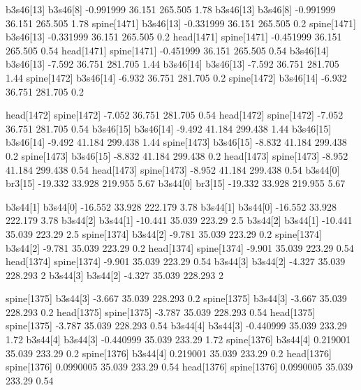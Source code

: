 b3s46[13]    b3s46[8]    -0.991999    36.151    265.505    1.78
b3s46[13]    b3s46[8]    -0.991999    36.151    265.505    1.78
spine[1471]    b3s46[13]    -0.331999    36.151    265.505    0.2
spine[1471]    b3s46[13]    -0.331999    36.151    265.505    0.2
head[1471]    spine[1471]    -0.451999    36.151    265.505    0.54
head[1471]    spine[1471]    -0.451999    36.151    265.505    0.54
b3s46[14]    b3s46[13]    -7.592    36.751    281.705    1.44
b3s46[14]    b3s46[13]    -7.592    36.751    281.705    1.44
spine[1472]    b3s46[14]    -6.932    36.751    281.705    0.2
spine[1472]    b3s46[14]    -6.932    36.751    281.705    0.2


head[1472]    spine[1472]    -7.052    36.751    281.705    0.54
head[1472]    spine[1472]    -7.052    36.751    281.705    0.54
b3s46[15]    b3s46[14]    -9.492    41.184    299.438    1.44
b3s46[15]    b3s46[14]    -9.492    41.184    299.438    1.44
spine[1473]    b3s46[15]    -8.832    41.184    299.438    0.2
spine[1473]    b3s46[15]    -8.832    41.184    299.438    0.2
head[1473]    spine[1473]    -8.952    41.184    299.438    0.54
head[1473]    spine[1473]    -8.952    41.184    299.438    0.54
b3s44[0]    br3[15]    -19.332    33.928    219.955    5.67
b3s44[0]    br3[15]    -19.332    33.928    219.955    5.67


b3s44[1]    b3s44[0]    -16.552    33.928    222.179    3.78
b3s44[1]    b3s44[0]    -16.552    33.928    222.179    3.78
b3s44[2]    b3s44[1]    -10.441    35.039    223.29    2.5
b3s44[2]    b3s44[1]    -10.441    35.039    223.29    2.5
spine[1374]    b3s44[2]    -9.781    35.039    223.29    0.2
spine[1374]    b3s44[2]    -9.781    35.039    223.29    0.2
head[1374]    spine[1374]    -9.901    35.039    223.29    0.54
head[1374]    spine[1374]    -9.901    35.039    223.29    0.54
b3s44[3]    b3s44[2]    -4.327    35.039    228.293    2
b3s44[3]    b3s44[2]    -4.327    35.039    228.293    2


spine[1375]    b3s44[3]    -3.667    35.039    228.293    0.2
spine[1375]    b3s44[3]    -3.667    35.039    228.293    0.2
head[1375]    spine[1375]    -3.787    35.039    228.293    0.54
head[1375]    spine[1375]    -3.787    35.039    228.293    0.54
b3s44[4]    b3s44[3]    -0.440999    35.039    233.29    1.72
b3s44[4]    b3s44[3]    -0.440999    35.039    233.29    1.72
spine[1376]    b3s44[4]    0.219001    35.039    233.29    0.2
spine[1376]    b3s44[4]    0.219001    35.039    233.29    0.2
head[1376]    spine[1376]    0.0990005    35.039    233.29    0.54
head[1376]    spine[1376]    0.0990005    35.039    233.29    0.54


